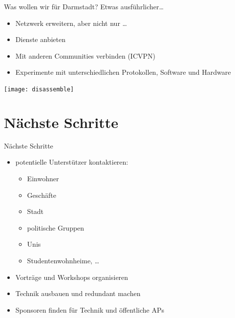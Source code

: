 \documentclass{beamer}
\begin{document}
\begin{frame}{Was wollen wir für Darmstadt?}
\vfill
Etwas ausführlicher\ldots
\begin{itemize}
\pause\item Netzwerk erweitern\pause, aber nicht nur \ldots
\pause\item Dienste anbieten
\pause\item Mit anderen Communities verbinden (ICVPN)
\pause\item Experimente mit unterschiedlichen Protokollen, Software und Hardware
\end{itemize}
\begin{center}
\vfill
\texttt{[image: disassemble]}
\end{center}
\vfill
\end{frame}

\section{Nächste Schritte}
\begin{frame}{Nächste Schritte}
\vfill
\begin{itemize}
\pause\item potentielle Unterstützer kontaktieren:
	\begin{itemize}
		\pause\item Einwohner
		\pause\item Geschäfte
		\pause\item Stadt
		\pause\item politische Gruppen
		\pause\item Unis
		\pause\item Studentenwohnheime, \ldots
	\end{itemize}
\pause\item Vorträge und Workshops organisieren
\pause\item Technik ausbauen und redundant machen
\pause\item Sponsoren finden für Technik und öffentliche APs
\end{itemize}
\vfill
\end{frame}
\end{document}

